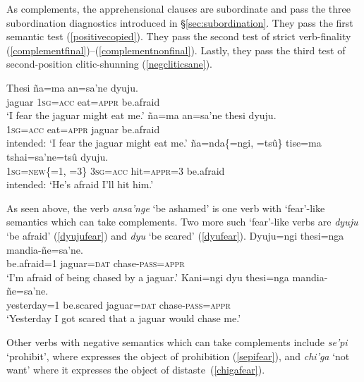 \documentclass[output=paper,colorlinks,citecolor=brown]{langscibook}
\begin{document}
\fi 

As complements, the apprehensional  clauses are subordinate and pass the three subordination diagnostics introduced in \S\ref{sec:subordination}. They pass the first semantic test (\ref{positivecopied}). They pass the second test of strict verb-finality (\ref{complementfinal})--(\ref{complementnonfinal}). Lastly, they pass the third test of second-position clitic-shunning (\ref{negcliticsane}).

  \begin{exe} \ex \label{complementfinal}
    \gll {\ob}Thesi ña=ma {an=sa'ne{\cb}} dyuju. \\
         jaguar \textsc{1sg=acc} eat=\textsc{appr} {be.afraid} \\
    \glt `I fear the jaguar might eat me.'
    \ex \label{complementnonfinal}
    \gll \bad{\ob}ña=ma an=sa'ne {thesi{\cb}} dyuju. \\
         \textsc{1sg=acc} eat=\textsc{appr} jaguar {be.afraid} \\
    \glt intended: `I fear the jaguar might eat me.'
    \ex \label{negcliticsane}
    \gll \bad{\ob}ña=nda\textup{\{}=ngi, =tsû\textup{\}} tise=ma {tshai=sa'ne=tsû{\cb}} dyuju. \\
         \textsc{1sg=new}\textup{\{}=1, \textsc{=}3\textup{\}} \textsc{3sg=acc} hit=\textsc{appr=3} {be.afraid} \\
    \glt intended: `He's afraid I'll hit him.'
\end{exe}

As seen above, the verb \emph{ansa'nge} `be ashamed' is one verb with `fear'-like semantics which can take  complements. Two more such `fear'-like verbs are \emph{dyuju} `be afraid' (\ref{dyujufear}) and \emph{dyu} `be scared' (\ref{dyufear}).
\ea \label{dyujufear} %
    \gll Dyuju=ngi   {\ob}thesi=nga      mandia-ñe=sa'ne.{\cb} \\
    {be.afraid\textsc{=}1} jaguar=\textsc{dat} chase-\textsc{pass=appr} \\
    \glt `I'm afraid of being chased by a jaguar.'
    \ex \label{dyufear} %
    \gll Kani=ngi  dyu         {\ob}thesi=nga      mandia-ñe=sa'ne.{\cb} \\
    yesterday\textsc{=}1 {be.scared} jaguar=\textsc{dat} chase-\textsc{pass=appr} \\
    \glt `Yesterday I got scared that a jaguar would chase me.'
\z

Other verbs with negative semantics which can take  complements include \emph{se'pi} `prohibit', where  expresses the object of prohibition (\ref{sepifear}), and \emph{chi'ga} `not want' where it expresses the object of distaste~(\ref{chigafear}).
\end{document}
